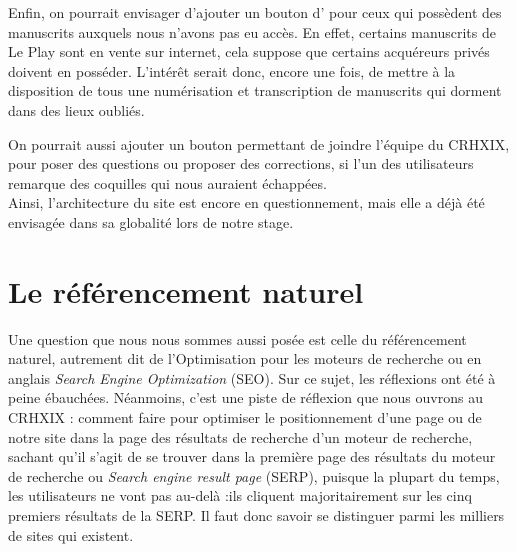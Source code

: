 Enfin, on pourrait envisager d'ajouter un bouton d' pour ceux qui possèdent des manuscrits auxquels nous n'avons pas eu accès. En effet, certains manuscrits de Le Play sont en vente sur internet, cela suppose que certains acquéreurs privés doivent en posséder. L'intérêt serait donc, encore une fois, de mettre à la disposition de tous une numérisation et transcription de manuscrits qui dorment dans des lieux oubliés.

On pourrait aussi ajouter un bouton  permettant de joindre l'équipe du CRHXIX, pour poser des questions ou proposer des corrections, si l'un des utilisateurs remarque des coquilles qui nous auraient échappées.\\

Ainsi, l'architecture du site est encore en questionnement, mais elle a déjà été envisagée dans sa globalité lors de notre stage.

\section{Le référencement naturel}

Une question que nous nous sommes aussi posée est celle du référencement naturel, autrement dit de l'Optimisation pour les moteurs de recherche ou en anglais \emph{Search Engine Optimization} (SEO). Sur ce sujet, les réflexions ont été à peine ébauchées. Néanmoins, c'est une piste de réflexion que nous ouvrons au CRHXIX : comment faire pour  optimiser le positionnement d'une page ou de notre site dans la page des résultats de recherche d'un moteur de recherche, sachant qu'il s'agit de se trouver dans la première page des résultats du moteur de recherche ou \emph{Search engine result page} (SERP), puisque la plupart du temps, les utilisateurs ne vont pas au-delà :ils cliquent majoritairement sur les cinq premiers résultats de la SERP.
Il faut donc savoir se distinguer parmi les milliers de sites qui existent.

